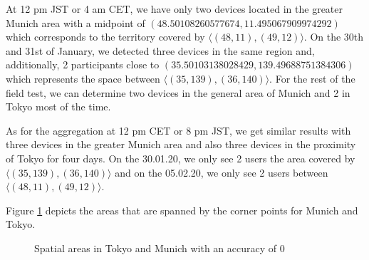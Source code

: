 At 12 pm JST or 4 am CET, we have only two devices located in the greater Munich area with a midpoint of \((48.50108260577674, 11.495067909974292)\) which corresponds to the territory covered by \(\langle(48, 11),(49, 12)\rangle\). On the 30th and 31st of January, we detected three devices in the same region and, additionally, 2 participants close to \((35.50103138028429, 139.49688751384306)\) which represents the space between \(\langle(35, 139),(36, 140)\rangle\). For the rest of the field test, we can determine two devices in the general area of Munich and 2 in Tokyo most of the time.

As for the aggregation at 12 pm CET or 8 pm JST, we get similar results with three devices in the greater Munich area and also three devices in the proximity of Tokyo for four days. On the 30.01.20, we only see 2 users the area covered by \(\langle(35, 139),(36, 140)\rangle\) and on the 05.02.20, we only see 2 users between \(\langle(48, 11),(49, 12)\rangle\).

Figure \ref{fig:acc0} depicts the areas that are spanned by the corner points for Munich and Tokyo. 

\begin{figure}[!htbp]
  \centering
  \hfill
  \caption{Spatial areas in Tokyo and Munich with an accuracy of 0}
  \label{fig:acc0}
\end{figure}


